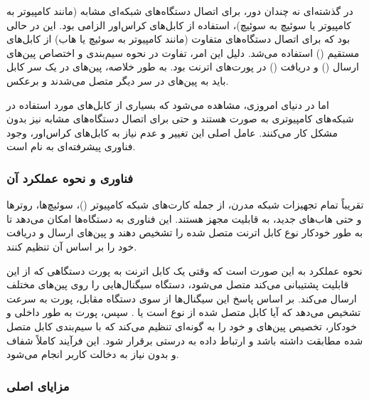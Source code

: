 
در گذشته‌ای نه چندان دور، برای اتصال دستگاه‌های شبکه‌ای مشابه (مانند کامپیوتر به کامپیوتر یا سوئیچ به سوئیچ)، استفاده از کابل‌های کراس‌اور الزامی بود. این در حالی بود که برای اتصال دستگاه‌های متفاوت (مانند کامپیوتر به سوئیچ یا هاب) از کابل‌های مستقیم () استفاده می‌شد. دلیل این امر، تفاوت در نحوه سیم‌بندی و اختصاص پین‌های ارسال () و دریافت () در پورت‌های اترنت بود. به طور خلاصه، پین‌های  در یک سر کابل باید به پین‌های  در سر دیگر متصل می‌شدند و برعکس.

اما در دنیای امروزی، مشاهده می‌شود که بسیاری از کابل‌های مورد استفاده در شبکه‌های کامپیوتری به صورت  هستند و حتی برای اتصال دستگاه‌های مشابه نیز بدون مشکل کار می‌کنند. عامل اصلی این تغییر و عدم نیاز به کابل‌های کراس‌اور، وجود فناوری پیشرفته‌ای به نام  است.

\subsubsection*{فناوری  و نحوه عملکرد آن}

تقریباً تمام تجهیزات شبکه مدرن، از جمله کارت‌های شبکه کامپیوتر ()، سوئیچ‌ها، روترها و حتی هاب‌های جدید، به قابلیت  مجهز هستند. این فناوری به دستگاه‌ها امکان می‌دهد تا به طور خودکار نوع کابل اترنت متصل شده را تشخیص دهند و پین‌های ارسال و دریافت خود را بر اساس آن تنظیم کنند.

نحوه عملکرد  به این صورت است که وقتی یک کابل اترنت به پورت دستگاهی که از این قابلیت پشتیبانی می‌کند متصل می‌شود، دستگاه سیگنال‌هایی را روی پین‌های مختلف ارسال می‌کند. بر اساس پاسخ این سیگنال‌ها از سوی دستگاه مقابل، پورت به سرعت تشخیص می‌دهد که آیا کابل متصل شده از نوع  است یا . سپس، پورت به طور داخلی و خودکار، تخصیص پین‌های  و  خود را به گونه‌ای تنظیم می‌کند که با سیم‌بندی کابل متصل شده مطابقت داشته باشد و ارتباط داده به درستی برقرار شود. این فرآیند کاملاً شفاف و بدون نیاز به دخالت کاربر انجام می‌شود.

\subsubsection*{مزایای اصلی }



